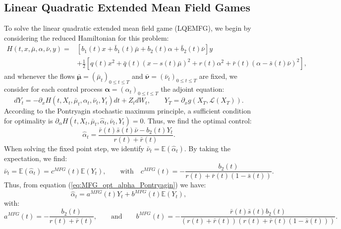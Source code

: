 \documentclass[11pt]{article}
\def\balpha{\boldsymbol{\alpha}}
\def\bmubar{\boldsymbol{\bar{\mu}}}
\def\bnubar{\boldsymbol{\bar{\nu}}}
\newcommand\cL{\mathcal L}
\begin{document}
\subsection{\textbf{Linear Quadratic Extended Mean Field Games}}\label{sec:EMFG}
To solve the linear quadratic extended mean field game (LQEMFG), we begin by considering the reduced Hamiltonian for this problem:
\begin{equation*}
\begin{split}
    H(t,x,\bar{\mu},\alpha,\bar{\nu},y)=&\left[b_1(t)x+\bar{b}_1(t)\bar{\mu}+b_2(t) \alpha+\bar{b}_2(t)\bar{\nu}\right]y \\
    &+\frac{1}{2}\left[q(t)x^2+\bar{q}(t)(x-s(t)\bar{\mu})^2 +r(t)\alpha^2+\bar{r}(t)(\alpha-\bar{s}(t)\bar{\nu})^2\right],
\end{split}
\end{equation*}
and whenever the flows $\bmubar=(\bar{\mu}_t)_{0\leq t\leq T}$ and $\bnubar=(\bar{\nu}_t)_{0\leq t\leq T}$ are fixed, we consider for each control process $\balpha=(\alpha_t)_{0\leq t\leq T}$ the adjoint equation:
\begin{equation*}
    dY_t=- \partial_x H(t,X_t,\bar{\mu}_t,\alpha_t,\bar{\nu}_t,Y_t)dt+Z_tdW_t,
    \qquad
    Y_T=\partial_xg(X_T, \cL(X_T)).
\end{equation*}
According to the Pontryagin stochastic maximum principle, a sufficient condition for optimality is $\partial_{\alpha}H(t,X_t,\bar{\mu}_t,\hat{\alpha}_t,\bar{\nu}_t,Y_t)=0$. Thus, we find the optimal control:
\begin{equation}
    \hat{\alpha}_t=\frac{\bar{r}(t)\bar{s}(t)\bar{\nu}-b_2(t)Y_t}{r(t)+\bar{r}(t)}.
\label{eq:MFG_opt_alpha_Pontryagin}
\end{equation}
When solving the fixed point step, we identify $\bar{\nu}_t=\mathbb{E}(\hat{\alpha}_t)$. By taking the expectation, we find:
\begin{equation*}
    \bar{\nu}_t = \mathbb{E}(\hat{\alpha}_t)=c^{MFG}(t)\mathbb{E}(Y_t),
	\qquad 
	\text{with} 
	\quad
    c^{MFG}(t)=-\frac{b_2(t)}{r(t)+\bar{r}(t)(1-\bar{s}(t))}.
\end{equation*}
Thus, from equation (\ref{eq:MFG_opt_alpha_Pontryagin}) we have:
\begin{equation}
    \hat{\alpha}_t=a^{MFG}(t) Y_t+b^{MFG}(t)\mathbb{E}(Y_t),
\label{eq:MFG_opt_alpha_Y_expY}
\end{equation}
with:
\begin{equation*}
	a^{MFG}(t)=-\frac{b_2(t)}{r(t)+\bar{r}(t)},
	\qquad
	\text{and}
	\qquad
	b^{MFG}(t)=-\frac{\bar{r}(t)\bar{s}(t)b_2(t)}{(r(t)+\bar{r}(t))(r(t)+\bar{r}(t)(1-\bar{s}(t)))}.
\end{equation*}
\end{document}
